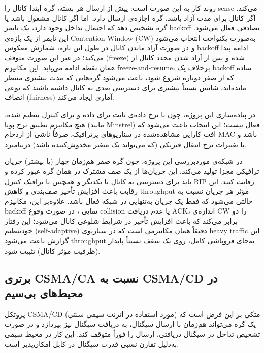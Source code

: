 \documentclass{article}
\begin{document}
	روند کار به این صورت است: پیش از ارسال هر بسته، گره ابتدا کانال را sense می‌کند. اگر کانال برای مدت  آزاد باشد، گره اجازه‌ی ارسال دارد. اما اگر کانال مشغول باشد یا گره تشخیص دهد که احتمال تداخل وجود دارد، یک تایمر backoff تصادفی فعال می‌شود. این تایمر از یک بازه‌ی Contention Window (CW) به‌صورت یکنواخت انتخاب می‌شود و در صورت آزاد ماندن کانال در طول این بازه، شمارش معکوس backoff ادامه پیدا می‌کند؛ در غیر این صورت متوقف (freeze) شده و پس از آزاد شدن مجدد کانال از همان نقطه ادامه می‌یابد. این مکانیزم freeze-and-resume، برخلاف یک backoff ساده که از صفر دوباره شروع شود، باعث می‌شود گره‌هایی که مدت بیشتری منتظر مانده‌اند، شانس نسبتاً بیشتری برای دسترسی بعدی به کانال داشته باشند که نوعی انصاف (fairness) آماری ایجاد می‌کند.
	
	در پیاده‌سازی این پروژه، چون  با نرخ داده‌ی ثابت  برای داده و  برای کنترل تنظیم شده، هیچ مکانیزم تطبیق نرخ پویا (مانند Minstrel) فعال نیست؛ این انتخاب باعث می‌شود که افت کارایی مشاهده‌شده در سناریوهای پرترافیک، صرفاً ناشی از ازدحام MAC باشد و با تغییرات نرخ انتقال فیزیکی (که می‌تواند یک متغیر مخدوش‌کننده باشد) درنیامیزد.
	
	در شبکه‌ی موردبررسی این پروژه، چون گره صفر هم‌زمان چهار (یا بیشتر) جریان ترافیکی مجزا تولید می‌کند، این جریان‌ها از یک صف مشترک در همان گره عبور کرده و باید برای دسترسی به کانال با یکدیگر و همچنین با ترافیک کنترل RIP رقابت کنند. این رقابت باعث افزایش تأخیر صف‌بندی  و کاهش throughput مؤثر هر جریان نسبت به حالتی می‌شود که فقط یک جریان به‌تنهایی در شبکه فعال باشد. علاوه‌بر این، مکانیزم backoff نمایی ، در صورت وقوع collision یا عدم دریافت ACK، اندازه‌ی CW را دو برابر می‌کند که باعث افزایش تأخیر در شرایط شلوغی کانال می‌شود؛ این رفتار خودتنظیم (self-adaptive) دقیقاً همان مکانیزمی است که در سناریوی heavy traffic این گزارش باعث می‌شود throughput به‌جای فروپاشی کامل، روی یک سقف نسبتاً پایدار (ظرفیت مؤثر کانال) تثبیت شود.
	
	\subsection{برتری CSMA/CA نسبت به CSMA/CD در محیط‌های بی‌سیم}
	پروتکل CSMA/CD (مورد استفاده در اترنت سیمی سنتی) متکی بر این فرض است که یک گره می‌تواند هم‌زمان با ارسال سیگنال، به دریافت سیگنال نیز بپردازد و در صورت تشخیص تداخل در سیگنال دریافتی، ارسال را فوراً متوقف کند. این کار در محیط سیمی به‌دلیل تقارن نسبی قدرت سیگنال در کابل امکان‌پذیر است.
	
\end{document}
